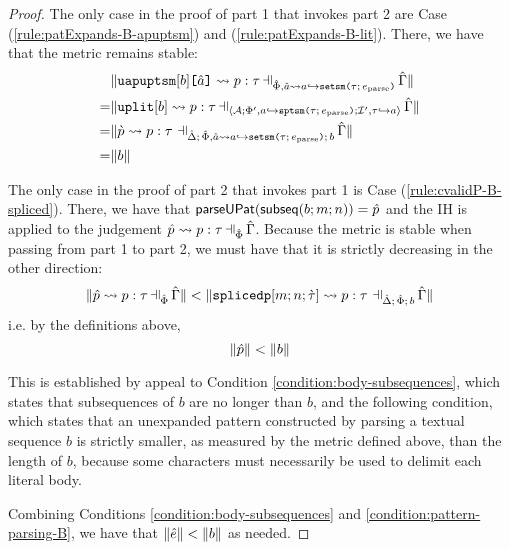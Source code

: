 \begin{proof}
The only case in the proof of part 1 that invokes part 2 are Case (\ref{rule:patExpands-B-apuptsm}) and (\ref{rule:patExpands-B-lit}). There, we have that the metric remains stable: \begin{align*}
 & \sizeof{\patExpands{\upctx}{\uPhi, \uShyp{\tsmv}{a}{\tau}{\eparse}}{\auapuptsm{b}{\tsmv}}{p}{\tau}}\\
=& \sizeof{\patExpands{\upctx}{\uASI{\uA}{\Phi', \xuptsmbnd{a}{\tau}{\eparse}}{\uI', \designate{\tau}{a}}}{\auplit{b}}{p}{\tau}}\\
=& \sizeof{{\cvalidP{\upctx}{\pscene{\uDelta}{\uPhi, \uShyp{\tsmv}{a}{\tau}{\eparse}}{b}}{\cpv}{p}{\tau}}}\\
=&\sizeof{b}\end{align*}

The only case in the proof of part 2 that invokes part 1 is Case (\ref{rule:cvalidP-B-spliced}). There, we have that $\mathsf{parseUPat}(\mathsf{subseq}(b; m; n))=\hat{p}$ and the IH is applied to the judgement $\patExpands{\upctx}{\uPhi}{\upv}{p}{\tau}$. Because the metric is stable when passing from part 1 to part 2, we must have that it is strictly decreasing in the other direction:
\[\sizeof{\patExpands{\upctx}{\uPhi}{\upv}{p}{\tau}} < \sizeof{{\cvalidP{\upctx}{\pscene{\uDelta}{\uPhi}{b}}{\acesplicedp{m}{n}{\ctau}}{p}{\tau}}}\]
i.e. by the definitions above, 
\[\Vert \hat{p} \Vert < \Vert b \Vert\]

This is established by appeal to Condition \ref{condition:body-subsequences}, which states that subsequences of $b$ are no longer than $b$, and the following condition, which states that an unexpanded pattern constructed by parsing a textual sequence $b$ is strictly smaller, as measured by the metric defined above, than the length of $b$, because some characters must necessarily be used to delimit each literal body.

Combining Conditions \ref{condition:body-subsequences} and \ref{condition:pattern-parsing-B}, we have that $\Vert {\hat e} \Vert < \Vert b \Vert$ as needed.
\end{proof}
